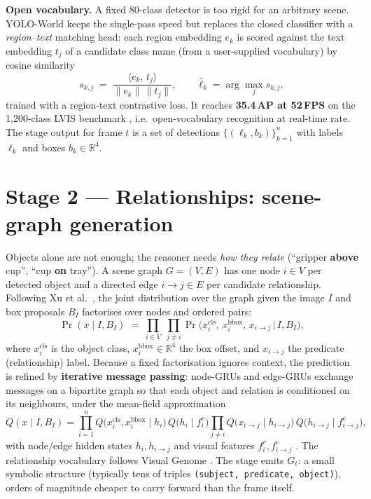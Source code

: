 \documentclass[10pt,letterpaper]{article}
\begin{document}
\textbf{Open vocabulary.} A fixed 80-class detector is too rigid for an arbitrary scene. YOLO-World
\cite{cheng2024} keeps the single-pass speed but replaces the closed classifier with a
\emph{region--text} matching head: each region embedding $e_k$ is scored against the text embedding
$t_j$ of a candidate class name (from a user-supplied vocabulary) by cosine similarity
\begin{equation}
s_{k,j} \;=\; \frac{\langle e_k,\, t_j\rangle}{\lVert e_k\rVert\,\lVert t_j\rVert},
\qquad \hat{\ell}_k = \arg\max_j s_{k,j},
\end{equation}
trained with a region-text contrastive loss. It reaches \textbf{35.4\,AP at 52\,FPS} on the
1{,}200-class LVIS benchmark \cite{cheng2024}, i.e.\ open-vocabulary recognition at real-time rate.
The stage output for frame $t$ is a set of detections $\{(\ell_k, b_k)\}_{k=1}^{n}$ with labels
$\ell_k$ and boxes $b_k\in\mathbb{R}^4$.

\section{Stage 2 --- Relationships: scene-graph generation}

Objects alone are not enough; the reasoner needs \emph{how they relate} (``gripper \textbf{above}
cup'', ``cup \textbf{on} tray''). A scene graph $G=(V,E)$ has one node $i\in V$ per detected object
and a directed edge $i\!\to\! j\in E$ per candidate relationship. Following Xu et al.\
\cite{xu2017}, the joint distribution over the graph given the image $I$ and box proposals $B_I$
factorises over nodes and ordered pairs:
\begin{equation}
\Pr(x \mid I, B_I) \;=\; \prod_{i\in V}\;\prod_{j\neq i}
   \Pr\!\big(x_i^{\text{cls}},\, x_i^{\text{bbox}},\, x_{i\to j} \,\big|\, I, B_I\big),
\end{equation}
where $x_i^{\text{cls}}$ is the object class, $x_i^{\text{bbox}}\in\mathbb{R}^4$ the box offset,
and $x_{i\to j}$ the predicate (relationship) label. Because a fixed factorisation ignores context,
the prediction is refined by \textbf{iterative message passing}: node-GRUs and edge-GRUs exchange
messages on a bipartite graph so that each object and relation is conditioned on its neighbours,
under the mean-field approximation
\begin{equation}
Q(x\mid I,B_I) = \prod_{i=1}^{n} Q\!\big(x_i^{\text{cls}},x_i^{\text{bbox}}\mid h_i\big)\,Q\!\big(h_i\mid f^{v}_i\big)
   \prod_{j\neq i} Q\!\big(x_{i\to j}\mid h_{i\to j}\big)\,Q\!\big(h_{i\to j}\mid f^{e}_{i\to j}\big),
\end{equation}
with node/edge hidden states $h_i, h_{i\to j}$ and visual features $f^v_i, f^e_{i\to j}$
\cite{xu2017}. The relationship vocabulary follows Visual Genome \cite{krishna2017}. The stage emits
$G_t$: a small symbolic structure (typically tens of triples \texttt{(subject, predicate, object)}),
orders of magnitude cheaper to carry forward than the frame itself.
\end{document}
